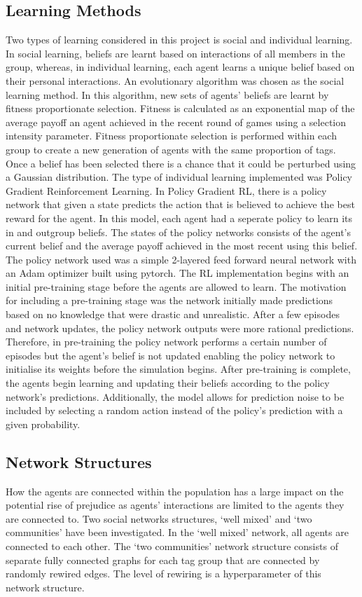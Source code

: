 \documentclass[]{llncs}
\begin{document}
 \subsection{Learning Methods}
Two types of learning considered in this project is social and individual learning. In social learning, beliefs are learnt based on interactions of all members in the group, whereas, in individual learning, each agent learns a unique belief based on their personal interactions. 
An evolutionary algorithm was chosen as the social learning method. In this algorithm, new sets of agents’ beliefs are learnt by fitness proportionate selection. Fitness is calculated as an exponential map of the average payoff an agent achieved in the recent round of games using a selection intensity parameter.  Fitness proportionate selection is performed within each group to create a new generation of agents with the same proportion of tags. Once a belief has been selected there is a chance that it could be perturbed using a Gaussian distribution. 
The type of individual learning implemented was Policy Gradient Reinforcement Learning.
In Policy Gradient RL, there is a policy network that given a state predicts the action that is believed to achieve the best reward for the agent. In this model, each agent had a seperate policy to learn its in and outgroup beliefs. The states of the policy networks consists of the agent’s current belief and the average payoff achieved in the most recent using this belief. The policy network used was a simple 2-layered feed forward neural network with an Adam optimizer built using pytorch. 
The RL implementation begins with an initial pre-training stage before the agents are allowed to learn. The motivation for including a pre-training stage was the network initially made predictions based on no knowledge that were drastic and unrealistic. After a few episodes and network updates, the policy network outputs were more rational predictions. Therefore, in pre-training the policy network performs a certain number of episodes but the agent’s belief is not updated enabling the policy network to initialise its weights before the simulation begins. After pre-training is complete, the agents begin learning and updating their beliefs according to the policy network’s predictions. Additionally, the model allows for prediction noise to be included by selecting a random action instead of the policy’s prediction with a given probability. 

\subsection{Network Structures}
How the agents are connected within the population has a large impact on the potential rise of prejudice as agents’ interactions are limited to the agents they are connected to. Two social networks structures, ‘well mixed’ and ‘two communities’ have been investigated. In the ‘well mixed’ network, all agents are connected to each other. The ‘two communities’ network structure consists of separate fully connected graphs for each tag group that are connected by randomly rewired edges. The level of rewiring is a hyperparameter of this network structure.
\end{document}
